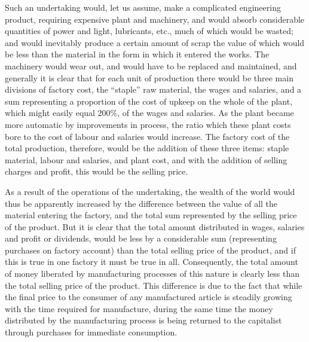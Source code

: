 \documentclass{book}
\begin{document}
Such an undertaking would, let us assume, make a complicated engineering product, requiring expensive plant and machinery, and would absorb considerable quantities of power and light, lubricants, etc., much of which would be wasted; and would inevitably produce a certain amount of scrap the value of which would be less than the material in the form in which it entered the works. The machinery would wear out, and would have to be replaced and maintained, and generally it is clear that for each unit of production there would be three main divisions of factory cost, the “staple” raw material, the wages and salaries, and a sum representing a proportion of the cost of upkeep on the whole of the plant, which might easily equal 200\%, of the wages and salaries. As the plant became more automatic by improvements in process, the ratio which these plant costs bore to the cost of labour and salaries would increase. The factory cost of the total production, therefore, would be the addition of these three items: staple material, labour and salaries, and plant cost, and with the addition of selling charges and profit, this would be the selling price.

As a result of the operations of the undertaking, the wealth of the world would thus be apparently increased by the difference between the value of all the material entering the factory, and the total sum represented by the selling price of the product. But it is clear that the total amount distributed in wages, salaries and profit or dividends, would be less by a considerable sum (representing purchases on factory account) than the total selling price of the product, and if this is true in one factory it must be true in all. Consequently, the total amount of money liberated by manufacturing processes of this nature is clearly less than the total selling price of the product. This difference is due to the fact that while the final price to the consumer of any manufactured article is steadily growing with the time required for manufacture, during the same time the money distributed by the manufacturing process is being returned to the capitalist through purchases for immediate consumption.
\end{document}
